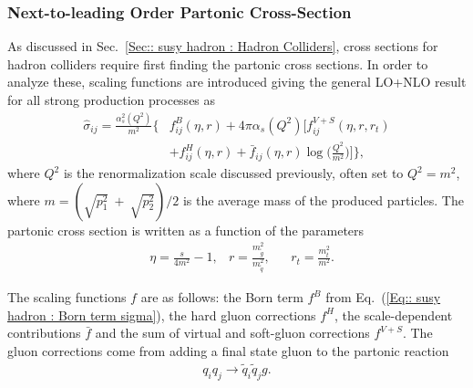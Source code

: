 \documentclass[twoside,english]{uiofysmaster}
\begin{document}
{\subsubsection{Next-to-leading Order Partonic Cross-Section}

As discussed in Sec.~\ref{Sec:: susy hadron : Hadron Colliders}, cross sections for hadron colliders require first finding the partonic cross sections. In order to analyze these, scaling functions are introduced \cite{Beenakker:1996ch} giving the general LO+NLO result for all strong production processes as
\begin{align}\label{Eq:: susy hadron : Partonic cross section LO+NLO}
\hat{\sigma}_{ij} = \frac{\alpha_s^2(Q^2)}{m^2} \Big\{ &f^B_{ij}(\eta, r) + 4 \pi \alpha_s (Q^2) \Bigg[ f_{ij}^{V+S}(\eta, r, r_t) \nonumber \\ & + f_{ij}^H (\eta, r) + \bar{f}_{ij} (\eta, r) \log \Bigg( \frac{Q^2}{m^2}\Bigg) \Bigg] \Big\},
\end{align}
where $Q^2$ is the renormalization scale discussed previously, often set to $Q^2 = m^2$, where $m = (\sqrt{p_1^2}~+~\sqrt{p_2^2})/2$ is the average mass of the produced particles. The partonic cross section is written as a function of the parameters
\begin{align}
&\eta = \frac{s}{4m^2} -1, &r= \frac{m_{\widetilde{g}}^2}{m_{\widetilde{q}}^2}, &&r_t = \frac{m_t^2}{m^2}.
\end{align} 

The scaling functions $f$ are as follows: the Born term $f^B$ from Eq.~(\ref{Eq:: susy hadron : Born term sigma}), the hard gluon corrections $f^H$, the scale-dependent contributions $\bar{f}$ and the sum of virtual and soft-gluon corrections $f^{V+S}$. The gluon corrections come from adding a final state gluon to the partonic reaction
\begin{align}
q_i q_j \rightarrow \widetilde{q}_i  \widetilde{q}_j g.
\end{align}

}
\end{document}
